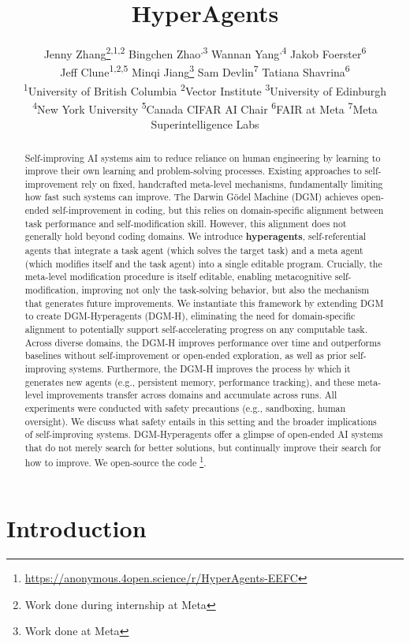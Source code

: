 \documentclass{article}
\title{HyperAgents}
\author{%
  Jenny Zhang\thanks{Work done during internship at Meta}\textsuperscript{,1,2} \quad
  Bingchen Zhao\footnotemark[1]\textsuperscript{,3} \quad
  Wannan Yang\footnotemark[1]\textsuperscript{,4} \quad
  Jakob Foerster\textsuperscript{6} \\
  Jeff Clune\textsuperscript{1,2,5} \quad
  Minqi Jiang\thanks{Work done at Meta}\textsuperscript{} \quad
  Sam Devlin\textsuperscript{7} \quad
  Tatiana Shavrina\textsuperscript{6} \\[0.5em]
  \textsuperscript{1}University of British Columbia \quad
  \textsuperscript{2}Vector Institute \quad
  \textsuperscript{3}University of Edinburgh \\
  \textsuperscript{4}New York University \quad
  \textsuperscript{5}Canada CIFAR AI Chair \quad
  \textsuperscript{6}FAIR at Meta \quad
  \textsuperscript{7}Meta Superintelligence Labs
}
\begin{document}
\maketitle

\begin{abstract}
Self-improving AI systems aim to reduce reliance on human engineering by learning to improve their own learning and problem-solving processes. Existing approaches to self-improvement rely on fixed, handcrafted meta-level mechanisms, fundamentally limiting how fast such systems can improve. The Darwin G\"odel Machine (DGM) achieves open-ended self-improvement in coding, but this relies on domain-specific alignment between task performance and self-modification skill. However, this alignment does not generally hold beyond coding domains. We introduce \textbf{hyperagents}, self-referential agents that integrate a task agent (which solves the target task) and a meta agent (which modifies itself and the task agent) into a single editable program. Crucially, the meta-level modification procedure is itself editable, enabling metacognitive self-modification, improving not only the task-solving behavior, but also the mechanism that generates future improvements. We instantiate this framework by extending DGM to create DGM-Hyperagents (DGM-H), eliminating the need for domain-specific alignment to potentially support self-accelerating progress on any computable task. Across diverse domains, the DGM-H improves performance over time and outperforms baselines without self-improvement or open-ended exploration, as well as prior self-improving systems. Furthermore, the DGM-H improves the process by which it generates new agents (e.g., persistent memory, performance tracking), and these meta-level improvements transfer across domains and accumulate across runs. All experiments were conducted with safety precautions (e.g., sandboxing, human oversight). We discuss what safety entails in this setting and the broader implications of self-improving systems. DGM-Hyperagents offer a glimpse of open-ended AI systems that do not merely search for better solutions, but continually improve their search for how to improve.
We open-source the code \footnote{\url{https://anonymous.4open.science/r/HyperAgents-EEFC}}.
\end{abstract}

\vspace{-0.5em}
\section{Introduction}
\label{sec:intro}
\vspace{-0.5em}
\end{document}
